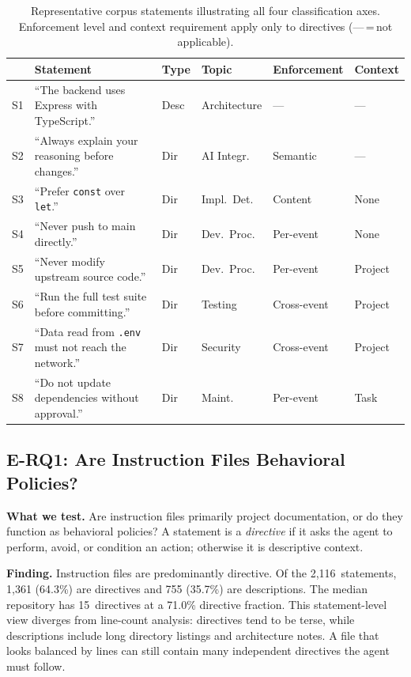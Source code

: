 \begin{table}[t]
\caption{Representative corpus statements illustrating all four
classification axes. Enforcement level and context requirement apply
only to directives (---\,=\,not applicable).}
\label{tab:examples}
\centering
\small
\begin{tabular}{@{}clllll@{}}
\toprule
& \textbf{Statement} & \textbf{Type} & \textbf{Topic} & \textbf{Enforcement} & \textbf{Context} \\
\midrule
S1 & ``The backend uses Express with TypeScript.'' & Desc & Architecture & --- & --- \\
S2 & ``Always explain your reasoning before changes.'' & Dir & AI Integr. & Semantic & --- \\
S3 & ``Prefer \texttt{const} over \texttt{let}.'' & Dir & Impl.\ Det. & Content & None \\
S4 & ``Never push to main directly.'' & Dir & Dev.\ Proc. & Per-event & None \\
S5 & ``Never modify upstream source code.'' & Dir & Dev.\ Proc. & Per-event & Project \\
S6 & ``Run the full test suite before committing.'' & Dir & Testing & Cross-event & Project \\
S7 & ``Data read from \texttt{.env} must not reach the network.'' & Dir & Security & Cross-event & Project \\
S8 & ``Do not update dependencies without approval.'' & Dir & Maint. & Per-event & Task \\
\bottomrule
\end{tabular}
\end{table}

\subsection{E-RQ1: Are Instruction Files Behavioral Policies?}

\noindent\textbf{What we test.} Are instruction files primarily project
documentation, or do they function as behavioral policies? A statement is
a \emph{directive} if it asks the agent to perform, avoid, or condition an
action; otherwise it is descriptive context.

\noindent\textbf{Finding.} Instruction files are predominantly directive.
Of the 2{,}116~statements, 1{,}361 (64.3\%) are directives and
755 (35.7\%) are descriptions. The median repository has 15~directives
at a 71.0\% directive fraction. This statement-level view diverges from
line-count analysis: directives tend to be terse, while descriptions
include long directory listings and architecture notes. A file that looks
balanced by lines can still contain many independent directives the agent must
follow.

